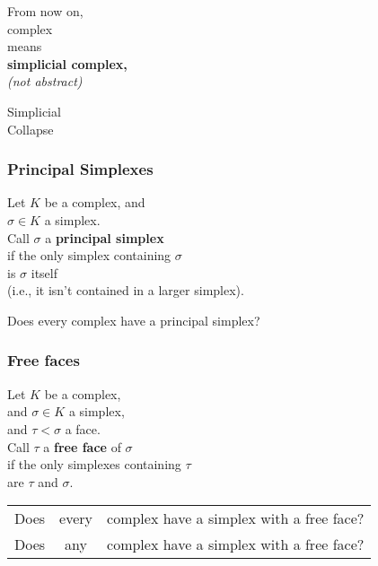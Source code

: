 \documentclass[14pt]{beamer}
\newcommand{\setbackgroundpicture}[1]{%
\usebackgroundtemplate{
\begin{pgfpicture}{0in}{0in}{\paperwidth}{\paperheight}
\pgfputat{\pgfxy(0,0)}{\texttt{[image: \#1]}}
\color{white}
\pgfsetfillopacity{0.8}
\pgfrect[fill]{\pgfxy(0,0)}{\pgfpoint{\paperwidth}{\paperheight}}
\end{pgfpicture}
}
}
\newcommand{\clearbackgroundpicture}{\usebackgroundtemplate{}}
\begin{document}
\begin{frame}
\vfill
\begin{center}
 From now on, \\
 {\Huge complex} \\
 means \\
 \textbf{simplicial complex,} \\
 \textit{(not abstract)}
\end{center}
\vfill
\end{frame}


\setbackgroundpicture{collapsedbarn.jpg}
\begin{frame}
  \vfill
  \begin{center}
    \Huge Simplicial \\
    Collapse
  \end{center}
  \vfill
\end{frame}
\clearbackgroundpicture

\begin{frame}
  \frametitle{Principal Simplexes}

  \begin{definition}
  Let $K$ be a complex, and \\
  $\sigma \in K$ a simplex.  \\
  Call $\sigma$ a \textbf{principal simplex} \\
  if the only simplex containing $\sigma$ \\
  is $\sigma$ itself \\
  \quad (i.e., it isn't contained in a larger simplex).
  \end{definition} 

  \pause
  \begin{problem}
  Does every complex have a principal simplex?
  \end{problem}

\end{frame}

\begin{frame}
  \frametitle{Free faces}

  \begin{definition}
  Let $K$ be a complex, \\
  and $\sigma \in K$ a simplex, \\
  and $\tau < \sigma$ a face. \\
  \vspace{1ex}Call $\tau$ a \textbf{free face} of $\sigma$ \\
  if the only simplexes containing $\tau$ \\
  are $\tau$ and $\sigma$.
  \end{definition}

  \pause
  \begin{problem}
    \begin{tabular}{@{}l@{ }c@{ }l}
      Does & every & complex have a simplex with a free face? \\\pause
      Does & any & complex have a simplex with a free face? \\
   \end{tabular}
 \end{problem}

\end{frame}
\end{document}
